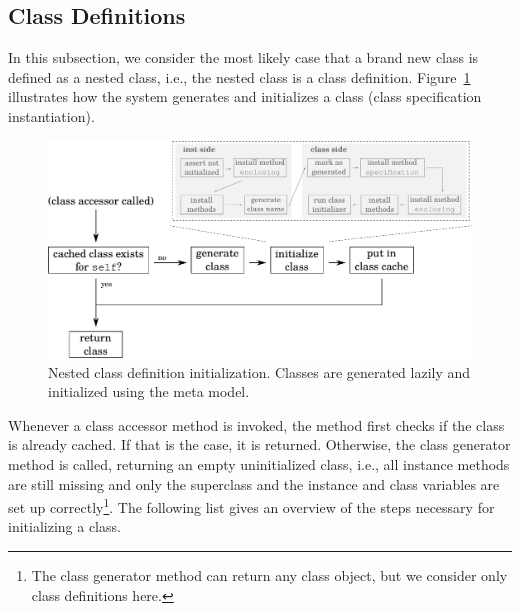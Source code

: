 \subsection{Class Definitions}
In this subsection, we consider the most likely case that a brand new class is defined as a nested class, i.e., the nested class is a class definition. Figure~\ref{fig:lazy_class_gen} illustrates how the system generates and initializes a class (class specification instantiation). 

\begin{figure}[!hbp]
	\includegraphics[width=\textwidth]{lazy_class_gen.pdf}
	\centering
	\caption[Nested class definition initialization]{Nested class definition initialization. Classes are generated lazily and initialized using the \msname meta model.}
	\label{fig:lazy_class_gen}
\end{figure}

Whenever a class accessor method is invoked, the method first checks if the class is already cached. If that is the case, it is returned. Otherwise, the class generator method is called, returning an empty uninitialized class, i.e., all instance methods are still missing and only the superclass and the instance and class variables are set up correctly\footnote{The class generator method can return any class object, but we consider only class definitions here.}. The following list gives an overview of the steps necessary for initializing a class.

